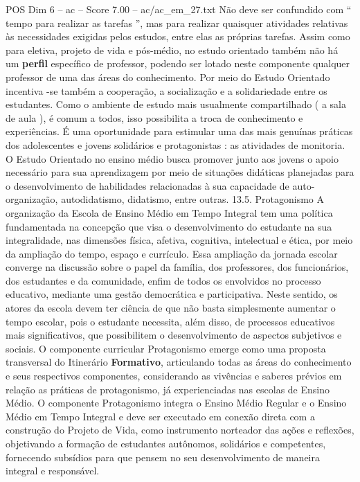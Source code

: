 \begin{textsample}{POS Dim 6 – ac – Score 7.00 – ac/ac\_em\_27.txt}
Não deve ser confundido com “ tempo para realizar as tarefas ”, mas para realizar quaisquer atividades relativas às necessidades exigidas pelos estudos, entre elas as próprias tarefas.
Assim como para eletiva, projeto de vida e pós-médio, no estudo orientado também não há um \textbf{perfil} específico de professor, podendo ser lotado neste componente qualquer professor de uma das áreas do conhecimento.
Por meio do Estudo Orientado incentiva -se também a cooperação, a socialização e a solidariedade entre os estudantes.
Como o ambiente de estudo mais usualmente compartilhado ( a sala de aula ), é comum a todos, isso possibilita a troca de conhecimento e experiências.
É uma oportunidade para estimular uma das mais genuínas práticas dos adolescentes e jovens solidários e protagonistas : as atividades de monitoria.
O Estudo Orientado no ensino médio busca promover junto aos jovens o apoio necessário para sua aprendizagem por meio de situações didáticas planejadas para o desenvolvimento de habilidades relacionadas à sua capacidade de auto-organização, autodidatismo, didatismo, entre outras. 13.5.
Protagonismo A organização da Escola de Ensino Médio em Tempo Integral tem uma política fundamentada na concepção que visa o desenvolvimento do estudante na sua integralidade, nas dimensões física, afetiva, cognitiva, intelectual e ética, por meio da ampliação do tempo, espaço e currículo.
Essa ampliação da jornada escolar converge na discussão sobre o papel da família, dos professores, dos funcionários, dos estudantes e da comunidade, enfim de todos os envolvidos no processo educativo, mediante uma gestão democrática e participativa.
Neste sentido, os atores da escola devem ter ciência de que não basta simplesmente aumentar o tempo escolar, pois o estudante necessita, além disso, de processos educativos mais significativos, que possibilitem o desenvolvimento de aspectos subjetivos e sociais.
O componente curricular Protagonismo emerge como uma proposta transversal do Itinerário \textbf{Formativo}, articulando todas as áreas do conhecimento e seus respectivos componentes, considerando as vivências e saberes prévios em relação as práticas de protagonismo, já experienciadas nas escolas de Ensino Médio.
O componente Protagonismo integra o Ensino Médio Regular e o Ensino Médio em Tempo Integral e deve ser executado em conexão direta com a construção do Projeto de Vida, como instrumento norteador das ações e reflexões, objetivando a formação de estudantes autônomos, solidários e competentes, fornecendo subsídios para que pensem no seu desenvolvimento de maneira integral e responsável.

\end{textsample}
